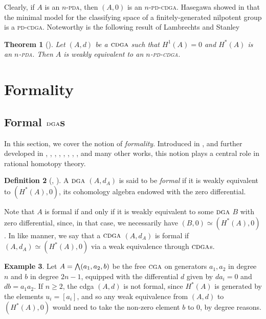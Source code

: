 \documentclass{article}
\numberwithin{equation}{section}
\newtheorem{theorem}{Theorem}[section]
\theoremstyle{definition}
\newtheorem{definition}[theorem]{Definition}
\newtheorem{example}[theorem]{Example}
\newcommand{\dga}{\ensuremath{\textsc{dga}}}
\newcommand{\cga}{\ensuremath{\textsc{cga}}}
\newcommand{\cdga}{\ensuremath{\textsc{cdga}}}
\newcommand{\bwedge}{\mbox{\normalsize $\bigwedge$}}
\begin{document}
Clearly, if $A$ is an $n$-\textsc{pda}, then $(A,0)$ is an 
$n$-\textsc{pd-cdga}.  Hasegawa showed in \cite{Has} that 
the minimal model for the classifying space of a finitely-generated 
nilpotent group is a \textsc{pd-cdga}. Noteworthy is the following 
result of Lambrechts and Stanley \cite{LS-asens} 

\begin{theorem}[\cite{LS-asens}]
\label{thm:LS}
Let $(A,d)$ be a $\cdga$ such that $H^1(A)=0$ and $H^{*}(A)$ is an $n$-\textsc{pda}.
Then $A$ is weakly equivalent to an $n$-\textsc{pd-cdga}.
\end{theorem}

\section{Formality}
\label{sect:formality}

\subsection{Formal $\dga$s}
\label{subsec:formal-dga}
In this section, we cover the notion of {\em formality}. Introduced in 
\cite{DGMS}, \cite{Sullivan77} and further developed in 
\cite{HS79}, \cite{Mo}, \cite{GM13}, \cite{Tanre}, \cite{PS-formal}, 
\cite{Mc10}, \cite{Sa17}, \cite{SW-forum}, 
and many other works, this notion plays a central role 
in rational homotopy theory.

\begin{definition}[\cite{DGMS}, \cite{Sullivan77}]
\label{def:formal}
A $\dga$ $(A,d_A)$ is said to be {\em formal}\/ if it is weakly equivalent to 
$(H^{*}(A),0)$, its cohomology algebra endowed with the zero differential. 
\end{definition}

Note that $A$ is formal if and only if it is weakly equivalent to some 
$\dga$ $B$ with zero differential, since, in that case, we necessarily have 
$(B,0)\simeq (H^{*}(A),0)$.  In like manner, we say that a $\cdga$ 
$(A,d_A)$ is formal if $(A,d_A)\simeq (H^*(A),0)$ via a weak 
equivalence through $\cdga$s. 

\begin{example}
\label{ex:non-formal-cdga}
Let $A=\bwedge(a_1,a_2,b)$ be the 
free $\cga$ on generators $a_1,a_2$ in degree $n$ and $b$ in degree 
$2n-1$, equipped with the differential $d$ given by $d a_i=0$ and 
$d b=a_1a_2$. If $n\ge 2$, the cdga $(A,d)$ is not formal, since 
$H^*(A)$ is generated by the elements $u_i=[a_i]$, 
and so any weak equivalence from $(A,d)$ to $(H^*(A), 0)$ 
would need to take the non-zero element $b$ to $0$, by degree reasons.
\end{example}
\end{document}
